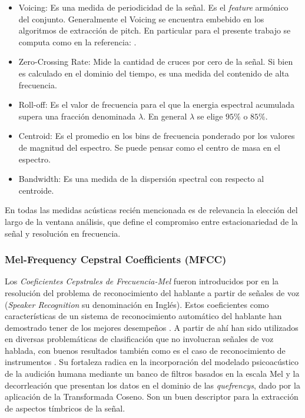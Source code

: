 \documentclass{article}
\begin{document}
\begin{itemize}
	\item Voicing: Es una medida de periodicidad de la señal. Es el \textit{feature} armónico del conjunto. Generalmente el Voicing se encuentra embebido en los algoritmos de extracción de pitch. En particular para el presente trabajo se computa como en la referencia: \cite{de2002yin}.   
	\item Zero-Crossing Rate: Mide la cantidad de cruces por cero de la señal. Si bien es calculado en el dominio del tiempo, es una medida del contenido de alta frecuencia.
	\item Roll-off: Es el valor de frecuencia para el que la energia espectral acumulada supera una fracción denominada $\lambda$. En general $\lambda$ se elige $95\%$ o $85\%$. 
	\item Centroid: Es el promedio en los bins de frecuencia ponderado por los valores de magnitud del espectro. Se puede pensar como el centro de masa en el espectro. 
	\item Bandwidth: Es una medida de la dispersión spectral con respecto al centroide.
\end{itemize}

En todas las medidas acústicas recién mencionada es de relevancia la elección del largo de la ventana análisis, que define el compromiso entre estacionariedad de la señal y resolución en frecuencia.

\subsubsection{Mel-Frequency Cepstral Coefficients (MFCC)} 

Los \textit{Coeficientes Cepstrales de Frecuencia-Mel} fueron introducidos por \cite{davis1980comparison} en la resolución del problema de reconocimiento del hablante a partir de señales de voz (\textit{Speaker Recognition} su denominación en Inglés). Estos coeficientes como características de un sistema de reconocimiento automático del hablante han demostrado tener de los mejores desempeños \citep[Capítulo~14]{quatieri2002discrete}. A partir de ahí han sido utilizados en diversas problemáticas de clasificación que no involucran señales de voz hablada, con buenos resultados también como es el caso de reconocimiento de instrumentos \citep[Capítulo~6]{klapuri2007signal}. Su fortaleza radica en la incorporación del modelado psicoacústico de la audición humana mediante un banco de filtros basados en la escala Mel \citep{stevens1937scale} y la decorrleación que presentan los datos en el dominio de las \textit{quefrencys}, dado por la aplicación de la Transformada Coseno. Son un buen descriptor para la extracción de aspectos tímbricos de la señal.
\medskip
\end{document}
